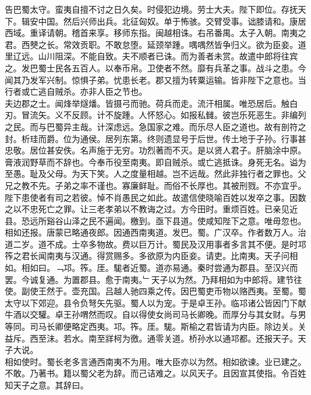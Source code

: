 \documentclass{zhvt-classic}
\begin{document}
\hspace*{2em}告巴蜀太守。蛮夷自擅不讨之日久矣。时侵犯边境。劳士大夫。陛下即位。存抚天下。辑安中国。然后兴师出兵。北征匈奴。单于怖骇。交臂受事。诎膝请和。康居西域。重译请朝。稽首来享。移师东指。闽越相诛。右吊番禺。太子入朝。南夷之君。西僰之长。常效贡职。不敢怠堕。延颈举踵。喁喁然皆争归义。欲为臣妾。道里辽远。山川阻深。不能自致。夫不顺者已诛。而为善者未赏。故遣中郎将往宾之。发巴蜀士民各五百人。以奉币帛。卫使者不然。靡有兵革之事。战斗之患。今闻其乃发军兴制。惊惧子弟。忧患长老。郡又擅为转粟运输。皆非陛下之意也。当行者或亡逃自贼杀。亦非人臣之节也。\\
\hspace*{2em}夫边郡之士。闻烽举燧燔。皆摄弓而驰。荷兵而走。流汗相属。唯恐居后。触白刃。冒流矢。义不反顾。计不旋踵。人怀怒心。如报私雠。彼岂乐死恶生。非编列之民。而与巴蜀异主哉。计深虑远。急国家之难。而乐尽人臣之道也。故有剖符之封。析珪而爵。位为通侯。居列东第。终则遗显号于后世。传土地于子孙。行事甚忠敬。居位甚安佚。名声施于无穷。功烈著而不灭。是以贤人君子。肝脑涂中原。膏液润野草而不辞也。今奉币役至南夷。即自贼杀。或亡逃抵诛。身死无名。谥为至愚。耻及父母。为天下笑。人之度量相越。岂不远哉。然此非独行者之罪也。父兄之教不先。子弟之率不谨也。寡廉鲜耻。而俗不长厚也。其被刑戮。不亦宜乎。\\
\hspace*{2em}陛下患使者有司之若彼。悼不肖愚民之如此。故遣信使晓喻百姓以发卒之事。因数之以不忠死亡之罪。让三老孝弟以不教诲之过。方今田时。重烦百姓。已亲见近县。恐远所谿谷山泽之民不遍闻。檄到。亟下县道。使咸知陛下之意。唯毋忽也。\\
\hspace*{2em}相如还报。唐蒙已略通夜郎。因通西南夷道。发巴。蜀。广汉卒。作者数万人。治道二岁。道不成。士卒多物故。费以巨万计。蜀民及汉用事者多言其不便。是时邛筰之君长闻南夷与汉通。得赏赐多。多欲原为内臣妾。请吏。比南夷。天子问相如。相如曰。﹁邛。筰。厓。駹者近蜀。道亦易通。秦时尝通为郡县。至汉兴而罢。今诚复通。为置郡县。愈于南夷。﹂天子以为然。乃拜相如为中郎将。建节往使。副使王然于。壶充国。吕越人驰四乘之传。因巴蜀吏币物以赂西夷。至蜀。蜀太守以下郊迎。县令负弩矢先驱。蜀人以为宠。于是卓王孙。临邛诸公皆因门下献牛酒以交驩。卓王孙喟然而叹。自以得使女尚司马长卿晚。而厚分与其女财。与男等同。司马长卿便略定西夷。邛。筰。厓。駹。斯榆之君皆请为内臣。除边关。关益斥。西至沬。若水。南至牂柯为徼。通零关道。桥孙水以通邛都。还报天子。天子大说。\\
\hspace*{2em}相如使时。蜀长老多言通西南夷不为用。唯大臣亦以为然。相如欲谏。业已建之。不敢。乃著书。籍以蜀父老为辞。而己诘难之。以风天子。且因宣其使指。令百姓知天子之意。其辞曰。\\
\end{document}
